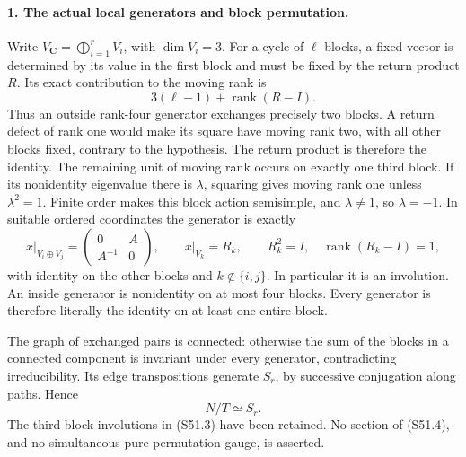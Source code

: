 \paragraph{1. The actual local generators and block permutation.}
Write \(V_{\mathbf C}=\bigoplus_{i=1}^rV_i\), with
\(\dim V_i=3\). For a cycle of \(\ell\) blocks, a fixed
vector is determined by its value in the first block and must
be fixed by the return product \(R\). Its exact contribution
to the moving rank is
\[
                 3(\ell-1)+\operatorname{rank}(R-I).
                                                               \tag{S51.2}
\]
Thus an outside rank-four generator exchanges precisely two
blocks. A return defect of rank one would make its square have
moving rank two, with all other blocks fixed, contrary to the
hypothesis. The return product is therefore the identity. The
remaining unit of moving rank occurs on exactly one third block.
If its nonidentity eigenvalue there is \(\lambda\), squaring
gives moving rank one unless \(\lambda^2=1\). Finite order
makes this block action semisimple, and \(\lambda\ne1\), so
\(\lambda=-1\). In suitable ordered coordinates the generator
is exactly
\[
 \left. x\right|_{V_i\oplus V_j}
      =\begin{pmatrix}0&A\\A^{-1}&0\end{pmatrix},
 \qquad \left.x\right|_{V_k}=R_k,
 \qquad R_k^2=I,\quad\operatorname{rank}(R_k-I)=1,
                                                               \tag{S51.3}
\]
with identity on the other blocks and \(k\notin\{i,j\}\).
In particular it is an involution. An inside generator is
nonidentity on at most four blocks. Every generator is therefore
literally the identity on at least one entire block.

The graph of exchanged pairs is connected: otherwise the sum of
the blocks in a connected component is invariant under every
generator, contradicting irreducibility. Its edge transpositions
generate \(S_r\), by successive conjugation along paths. Hence
\[
                              N/T\simeq S_r.              \tag{S51.4}
\]
The third-block involutions in (S51.3) have been retained. No
section of (S51.4), and no simultaneous pure-permutation gauge,
is asserted.

